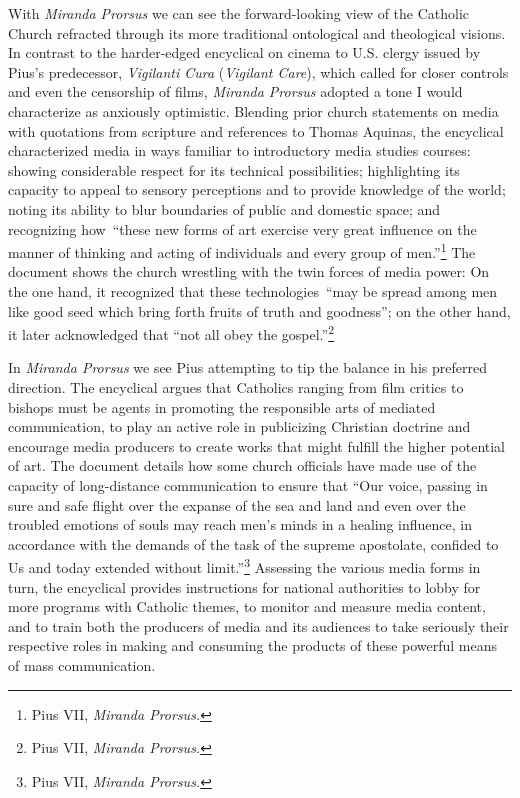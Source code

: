 \documentclass{tufte-handout}
\begin{document}
With \emph{Miranda Prorsus} we can see the forward-looking view of the
Catholic Church refracted through its more traditional ontological and
theological visions. In contrast to the harder-edged encyclical on
cinema to U.S. clergy issued by Pius's predecessor, \emph{Vigilanti
Cura} (\emph{Vigilant Care}), which called for closer controls and even
the censorship of films, \emph{Miranda Prorsus} adopted a tone I would
characterize as anxiously optimistic. Blending prior church statements
on media with quotations from scripture and references to Thomas
Aquinas, the encyclical characterized media in ways familiar to
introductory media studies courses: showing considerable respect for its
technical possibilities; highlighting its capacity to appeal to sensory
perceptions and to provide knowledge of the world; noting its ability to
blur boundaries of public and domestic space; and recognizing
how~``these new forms of art exercise very great influence on the manner
of thinking and acting of individuals and every group of
men.''\footnote{Pius VII, \emph{Miranda Prorsus.}} The document shows
the church wrestling with the twin forces of media power: On the one
hand, it recognized that these technologies~``may be spread among men
like good seed which bring forth fruits of truth and goodness''; on the
other hand, it later acknowledged that ``not all obey the
gospel.''\footnote{Pius VII, \emph{Miranda Prorsus.}}

In \emph{Miranda Prorsus} we see Pius attempting to tip the balance in
his preferred direction. The encyclical argues that Catholics ranging
from film critics to bishops must be agents in promoting the responsible
arts of mediated communication, to play an active role in publicizing
Christian doctrine and encourage media producers to create works that
might fulfill the higher potential of art. The document details how some
church officials have made use of the capacity of long-distance
communication to ensure that ``Our voice, passing in sure and safe
flight over the expanse of the sea and land and even over the troubled
emotions of souls may reach men's minds in a healing influence, in
accordance with the demands of the task of the supreme apostolate,
confided to Us and today extended without limit.''\footnote{Pius VII,
  \emph{Miranda Prorsus.}} Assessing the various media forms in turn,
the encyclical provides instructions for national authorities to lobby
for more programs with Catholic themes, to monitor and measure media
content, and to train both the producers of media and its audiences to
take seriously their respective roles in making and consuming the
products of these powerful means of mass communication.
\end{document}
